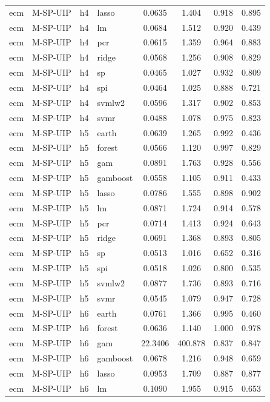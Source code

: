 \begin{ThreePartTable}
\begin{longtable}[t]{llclcccc}
ecm & M-SP-UIP & h4 & lasso & 0.0635 & 1.404 & 0.918 & 0.895\\
ecm & M-SP-UIP & h4 & lm & 0.0684 & 1.512 & 0.920 & 0.439\\
ecm & M-SP-UIP & h4 & pcr & 0.0615 & 1.359 & 0.964 & 0.883\\
ecm & M-SP-UIP & h4 & ridge & 0.0568 & 1.256 & 0.908 & 0.829\\
ecm & M-SP-UIP & h4 & sp & 0.0465 & 1.027 & 0.932 & 0.809\\
ecm & M-SP-UIP & h4 & spi & 0.0464 & 1.025 & 0.888 & 0.721\\
ecm & M-SP-UIP & h4 & svmlw2 & 0.0596 & 1.317 & 0.902 & 0.853\\
ecm & M-SP-UIP & h4 & svmr & 0.0488 & 1.078 & 0.975 & 0.823\\
\addlinespace
ecm & M-SP-UIP & h5 & earth & 0.0639 & 1.265 & 0.992 & 0.436\\
ecm & M-SP-UIP & h5 & forest & 0.0566 & 1.120 & 0.997 & 0.829\\
ecm & M-SP-UIP & h5 & gam & 0.0891 & 1.763 & 0.928 & 0.556\\
ecm & M-SP-UIP & h5 & gamboost & 0.0558 & 1.105 & 0.911 & 0.433\\
ecm & M-SP-UIP & h5 & lasso & 0.0786 & 1.555 & 0.898 & 0.902\\
ecm & M-SP-UIP & h5 & lm & 0.0871 & 1.724 & 0.914 & 0.578\\
ecm & M-SP-UIP & h5 & pcr & 0.0714 & 1.413 & 0.924 & 0.643\\
ecm & M-SP-UIP & h5 & ridge & 0.0691 & 1.368 & 0.893 & 0.805\\
ecm & M-SP-UIP & h5 & sp & 0.0513 & 1.016 & 0.652 & 0.316\\
ecm & M-SP-UIP & h5 & spi & 0.0518 & 1.026 & 0.800 & 0.535\\
ecm & M-SP-UIP & h5 & svmlw2 & 0.0877 & 1.736 & 0.893 & 0.716\\
ecm & M-SP-UIP & h5 & svmr & 0.0545 & 1.079 & 0.947 & 0.728\\
\addlinespace
ecm & M-SP-UIP & h6 & earth & 0.0761 & 1.366 & 0.995 & 0.460\\
ecm & M-SP-UIP & h6 & forest & 0.0636 & 1.140 & 1.000 & 0.978\\
ecm & M-SP-UIP & h6 & gam & 22.3406 & 400.878 & 0.837 & 0.847\\
ecm & M-SP-UIP & h6 & gamboost & 0.0678 & 1.216 & 0.948 & 0.659\\
ecm & M-SP-UIP & h6 & lasso & 0.0953 & 1.709 & 0.887 & 0.877\\
ecm & M-SP-UIP & h6 & lm & 0.1090 & 1.955 & 0.915 & 0.653\\

\end{longtable}
\end{ThreePartTable}
